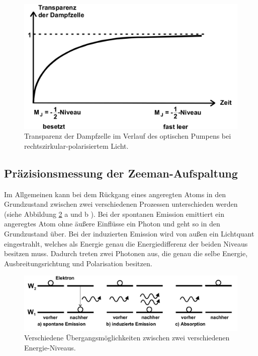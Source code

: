 \begin{figure}[h]
  \centering
  \includegraphics[width=\textwidth]{Pics/Transparenz1.png}
  \caption{Transparenz der Dampfzelle im Verlauf des optischen Pumpens bei
  rechtszirkular-polarisiertem Licht. \cite{Anleitung}}
  \label{fig:Transparenz1}
\end{figure}

\subsection{Präzisionsmessung der Zeeman-Aufspaltung}
\label{subsec:Praezission}

Im Allgemeinen kann bei dem Rückgang eines angeregten Atoms in den Grundzustand
zwischen zwei verschiedenen Prozessen unterschieden werden (siehe Abbildung
\ref{fig:Emission} a und b ). Bei der spontanen Emission
emittiert ein angeregtes Atom ohne äußere Einflüsse ein Photon und geht so in den
Grundzustand über. Bei der induzierten Emission wird von außen ein Lichtquant eingestrahlt,
welches als Energie genau die Energiedifferenz der beiden Niveaus besitzen muss.
Dadurch treten zwei Photonen aus, die genau die selbe Energie, Ausbreitungsrichtung
und Polarisation besitzen.

\begin{figure}[h]
  \centering
  \includegraphics[width=\textwidth]{Pics/Emission.png}
  \caption{Verschiedene Übergangsmöglichkeiten zwischen zwei verschiedenen
  Energie-Niveaus. \cite{Anleitung}}
  \label{fig:Emission}
\end{figure}

